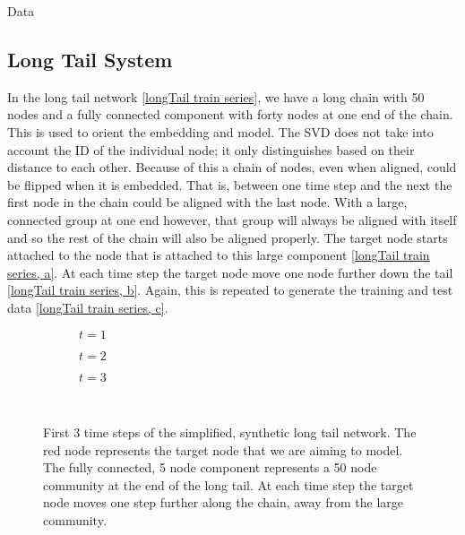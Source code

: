 \documentclass[12pt]{amsart}
\begin{document}
\begin{section}{Data}
    \subsection{Long Tail System}
        In the long tail network \autoref{longTail train series}, we have a long chain with 50 nodes and a fully connected component with forty nodes at one end of the chain. This is used to orient the embedding and model. The SVD does not take into account the ID of the individual node; it only distinguishes based on their distance to each other. Because of this a chain of nodes, even when aligned, could be flipped when it is embedded. That is, between one time step and the next the first node in the chain could be aligned with the last node. With a large, connected group at one end however, that group will always be aligned with itself and so the rest of the chain will also be aligned properly. The target node starts attached to the node that is attached to this large component \autoref{longTail train series, a}. At each time step the target node move one node further down the tail \autoref{longTail train series, b}. Again, this is repeated to generate the training and test data \autoref{longTail train series, c}.
        \begin{figure}[H]
            \centering
            \begin{subfigure}[c]{0.3\textwidth}
                \centering
                \resizebox{.6\width}{!}{}
                \caption{$t=1$}
                \label{longTail train series, a}
            \end{subfigure}
            \hfill
            \centering
            \begin{subfigure}[c]{0.3\textwidth}
                \centering
                \resizebox{.6\width}{!}{}
                \caption{$t=2$}
                \label{longTail train series, b}
            \end{subfigure}
            \hfill
            \centering
            \begin{subfigure}[c]{0.3\textwidth}
                \centering
                \resizebox{.6\width}{!}{}
                \caption{$t=3$}
                \label{longTail train series, c}
            \end{subfigure}\\
            \caption{First 3 time steps of the simplified, synthetic long tail network. The red node represents the target node that we are aiming to model. The fully connected, 5 node component represents a 50 node community at the end of the long tail. At each time step the target node moves one step further along the chain, away from the large community.}
            \label{longTail train series}
        \end{figure}    


\end{section}
\end{document}
